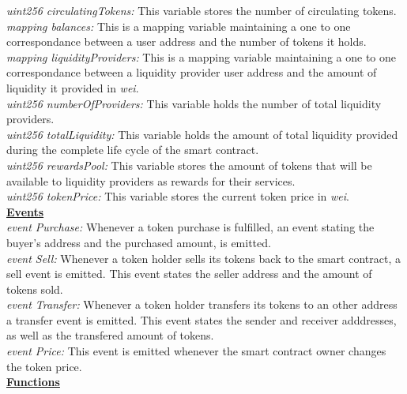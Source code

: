 \documentclass[12pt,a4paper]{article}
\begin{document}
\emph{uint256 circulatingTokens:}  This variable stores the number of
circulating tokens.\\

\emph{mapping balances:} This is a mapping variable maintaining a one to one
correspondance between a user address and the number of tokens it holds. \\

\emph{mapping liquidityProviders:} This is a mapping variable maintaining a one
to one correspondance between a liquidity provider user address and the amount
of liquidity it provided in \emph{wei}. \\

\emph{uint256 numberOfProviders:} This variable holds the number of total
liquidity providers.\\

\emph{uint256 totalLiquidity:} This variable holds the amount of total liquidity
provided during the complete life cycle of the smart contract.\\

\emph{uint256 rewardsPool:} This variable stores the amount of tokens that will
be available to liquidity providers as rewards for their services.\\

\emph{uint256 tokenPrice:} This variable stores the current token price in
\emph{wei}.\\

\textbf{\underline{Events}} \\

\emph{event Purchase:} Whenever a token purchase is fulfilled, an event stating
the buyer's address and the purchased amount, is emitted.\\

\emph{event Sell:} Whenever a token holder sells its tokens back to the smart
contract, a sell event is emitted. This event states the seller address and the
amount of tokens sold.\\

\emph{event Transfer:} Whenever a token holder transfers its tokens to an other
address a transfer event is emitted. This event states the sender and receiver
adddresses, as well as the transfered amount of tokens.\\

\emph{event Price:} This event is emitted whenever the smart contract owner
changes the token price.\\

\textbf{\underline{Functions}} \\
\end{document}
